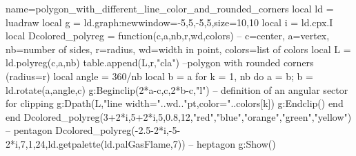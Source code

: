 \begin{luadraw}{name=polygon_with_different_line_color_and_rounded_corners}
local ld = luadraw
local g = ld.graph:new{window={-5,5,-5,5},size={10,10}}
local i = ld.cpx.I
local Dcolored_polyreg = function(c,a,nb,r,wd,colors)
-- c=center, a=vertex, nb=number of sides, r=radius, wd=width in point, colors=list of colors
    local L = ld.polyreg(c,a,nb)
    table.append(L,{r,"cla"}) --polygon with rounded corners (radius=r)
    local angle = 360/nb
    local b = a
    for k = 1, nb do
        a = b; b = ld.rotate(a,angle,c)
        g:Beginclip({2*a-c,c,2*b-c,"l"}) -- definition of an angular sector for clipping
        g:Dpath(L,"line width="..wd.."pt,color="..colors[k])
        g:Endclip()
    end
end
Dcolored_polyreg(3+2*i,5+2*i,5,0.8,12,{"red","blue","orange","green","yellow"}) -- pentagon
Dcolored_polyreg(-2.5-2*i,-5-2*i,7,1,24,ld.getpalette(ld.palGasFlame,7)) -- heptagon
g:Show()
\end{luadraw}
